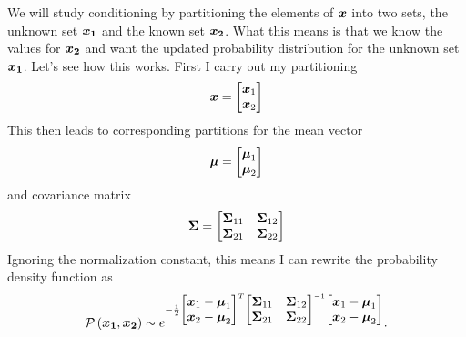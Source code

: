 \documentclass[../../main.tex]{subfiles}
\begin{document}
We will study conditioning by partitioning the elements of $\boldsymbol{x}$ into two
sets, the unknown set $\boldsymbol{x_1}$ and the known set $\boldsymbol{x_2}$.  What this means
is that we know the values for $\boldsymbol{x_2}$ and want the updated probability
distribution for the unknown set $\boldsymbol{x_1}$. Let's see how this works.  First I
carry out my partitioning
\begin{equation}
    \label{eq:xpartition}
    \boldsymbol{x} = 
    \begin{bmatrix}
        \boldsymbol{x}_1 \\
        \boldsymbol{x}_2
    \end{bmatrix}
\end{equation}
This then leads to corresponding partitions for the mean vector
\begin{equation}
    \label{eq:meanpartition}
    \boldsymbol{\mu} = 
    \begin{bmatrix}
        \boldsymbol{\mu}_1 \\
        \boldsymbol{\mu}_2
    \end{bmatrix}
\end{equation}
and covariance matrix
\begin{equation}
    \label{eq:meanpartition}
    \boldsymbol{\Sigma} = 
    \begin{bmatrix}
        \boldsymbol{\Sigma}_{11} & \boldsymbol{\Sigma}_{12} \\ 
        \boldsymbol{\Sigma}_{21} & \boldsymbol{\Sigma}_{22} \\
    \end{bmatrix}
\end{equation}
Ignoring the normalization constant, this means I can rewrite the probability
density function as
\begin{equation}
    \mathcal{P}\left(\boldsymbol{x_1}, \boldsymbol{x_2} \right)
     \sim e^{
        -\frac{1}{2}
        \begin{bmatrix}
            \boldsymbol{x}_1 - \boldsymbol{\mu}_1 \\
            \boldsymbol{x}_2 - \boldsymbol{\mu}_2
        \end{bmatrix}^T
        \begin{bmatrix}
            \boldsymbol{\Sigma}_{11} & \boldsymbol{\Sigma}_{12} \\ 
            \boldsymbol{\Sigma}_{21} & \boldsymbol{\Sigma}_{22} \\
        \end{bmatrix}^{-1}
        \begin{bmatrix}
            \boldsymbol{x}_1 - \boldsymbol{\mu}_1 \\
            \boldsymbol{x}_2 - \boldsymbol{\mu}_2
        \end{bmatrix}
     }.
\end{equation}
\end{document}
